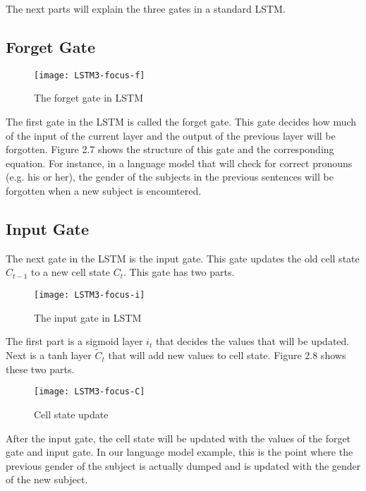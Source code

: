         The next parts will explain the three gates in a standard LSTM.

    \subsection{Forget Gate}
        \begin{figure}[h]
        \centering
        \texttt{[image: LSTM3-focus-f]}
        \caption{The forget gate in LSTM}
        \end{figure}
        The first gate in the LSTM is called the forget gate. This gate decides how much of the input of the current layer and the output of the previous layer will be forgotten. Figure 2.7 shows the structure of this gate and the corresponding equation. For instance, in a language model that will check for correct pronouns (e.g. his or her), the gender of the subjects in the previous sentences will be forgotten when a new subject is encountered.

    \subsection{Input Gate}
        The next gate in the LSTM is the input gate. This gate updates the old cell state \( C_{t-1} \) to a new cell state \( C_t \). This gate has two parts.

        \begin{figure}[h]
        \centering
        \texttt{[image: LSTM3-focus-i]}
        \caption{The input gate in LSTM}
        \end{figure}
        The first part is a sigmoid layer \( i_t \) that decides the values that will be updated. Next is a tanh layer \(\tilde{C}_t\) that will add new values to cell state. Figure 2.8 shows these two parts.

        \begin{figure}[h]
        \centering
        \texttt{[image: LSTM3-focus-C]}
        \caption{Cell state update}
        \end{figure}
        After the input gate, the cell state will be updated with the values of the forget gate and input gate. In our language model example, this is the point where the previous gender of the subject is actually dumped and is updated with the gender of the new subject.

